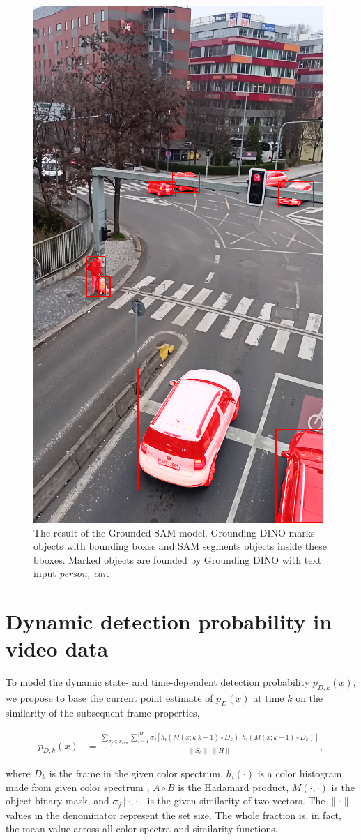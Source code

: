 \begin{figure}[h]
  \centering
  \includegraphics[width=0.35\linewidth]{text/chapter_04/imgs/DINO_example}
  \caption{The result of the Grounded SAM model. Grounding DINO marks objects with bounding boxes and SAM segments
  objects inside these bboxes. Marked objects are founded by Grounding DINO with text input \textit{person, car}.}
  \label{fig:GroundedSAM}
\end{figure}



\section{Dynamic detection probability in video data}
\label{sec:dynamic_pd}
To model the dynamic state- and time-dependent detection probability $p_{D,k}(x)$, we propose to base the current
point estimate of $p_{D}(x)$ at time $k$ on the similarity of the subsequent frame properties,

  \begin{align}
    p_{D,k}(x) &= \frac{\sum_{\sigma_j \in S_{sim}} \sum_{i=1}^{|H|}
      \sigma_j\left[h_i\left(M(x; k|k-1) \!\circ\! D_k\right),
        h_i\left(M(x; k-1) \!\circ\! D_k\right)\right]}{\|S_c\| \cdot \|H\|}, \label{eq:similarity}
  \end{align}

where $D_k$ is the frame in the given color spectrum, $h_i(\cdot)$ is a color histogram made from given color spectrum
, $A\circ B$ is the Hadamard product, $M(\cdot, \cdot)$ is the object binary mask, and $\sigma_j[\cdot, \cdot]$ is
the given similarity of two vectors. The $\|\cdot\|$ values in the denominator represent the set size. The whole
fraction is, in fact, the mean value across all color spectra and similarity functions.

